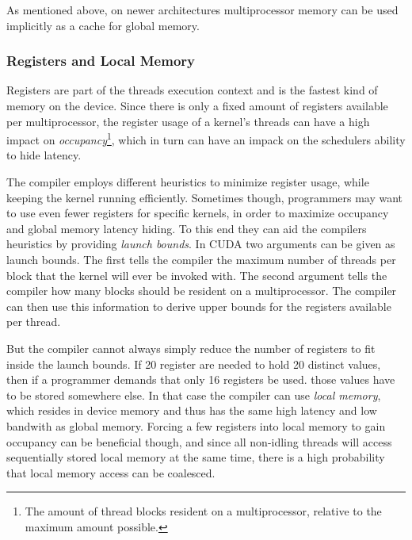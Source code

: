 As mentioned above, on newer architectures multiprocessor memory can
be used implicitly as a cache for global memory.




\subsubsection{Registers and Local Memory}


Registers are part of the threads execution context and is the fastest
kind of memory on the device. Since there is only a fixed amount of
registers available per multiprocessor, the register usage of a
kernel's threads can have a high impact on
\textit{occupancy}\footnote{The amount of thread blocks resident on a
  multiprocessor, relative to the maximum amount possible.}, which in
turn can have an impack on the schedulers ability to hide latency.


The compiler employs different heuristics to minimize register usage,
while keeping the kernel running efficiently. Sometimes though,
programmers may want to use even fewer registers for specific kernels,
in order to maximize occupancy and global memory latency hiding. To
this end they can aid the compilers heuristics by providing
\textit{launch bounds}. In CUDA two arguments can be given as launch
bounds. The first tells the compiler the maximum number of threads per
block that the kernel will ever be invoked with. The second argument
tells the compiler how many blocks should be resident on a
multiprocessor. The compiler can then use this information to derive
upper bounds for the registers available per thread.





But the compiler cannot always simply reduce the number of registers
to fit inside the launch bounds. If 20 register are needed to hold 20
distinct values, then if a programmer demands that only 16 registers
be used. those values have to be stored somewhere else. In that case
the compiler can use \textit{local memory}, which resides in device
memory and thus has the same high latency and low bandwith as global
memory. Forcing a few registers into local memory to gain occupancy
can be beneficial though, and since all non-idling threads will access
sequentially stored local memory at the same time, there is a high
probability that local memory access can be coalesced.

